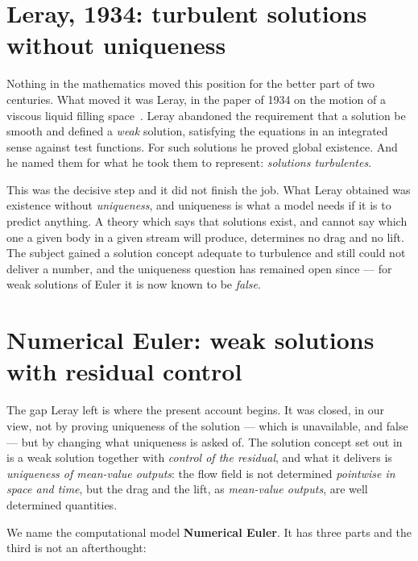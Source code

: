 \documentclass[11pt]{article}
\begin{document}
\section{Leray, 1934: turbulent solutions without uniqueness}\label{sec:leray}

Nothing in the mathematics moved this position for the better part of two centuries. What moved it
was Leray, in the paper of 1934 on the motion of a viscous liquid filling space~\cite{leray}. Leray
abandoned the requirement that a solution be smooth and defined a \emph{weak} solution, satisfying
the equations in an integrated sense against test functions. For such solutions he proved global
existence. And he named them for what he took them to represent: \emph{solutions turbulentes}.

This was the decisive step and it did not finish the job. What Leray obtained was existence without
\emph{uniqueness}, and uniqueness is what a model needs if it is to predict anything. A theory which
says that solutions exist, and cannot say which one a given body in a given stream will produce,
determines no drag and no lift. The subject gained a solution concept adequate to turbulence and
still could not deliver a number, and the uniqueness question has remained open since --- for weak
solutions of Euler it is now known to be \emph{false}.

\section{Numerical Euler: weak solutions with residual control}\label{sec:digital}

The gap Leray left is where the present account begins. It was closed, in our view, not by proving
uniqueness of the solution --- which is unavailable, and false --- but by changing what uniqueness is
asked of. The solution concept set out in~\cite{book} is a weak solution together with
\emph{control of the residual}, and what it delivers is \emph{uniqueness of mean-value outputs}: the
flow field is not determined \emph{pointwise in space and time}, but the drag and the lift, as
\emph{mean-value outputs}, are well determined quantities.

We name the computational model \textbf{Numerical Euler}. It has three parts and the third is not an
afterthought:
\end{document}
